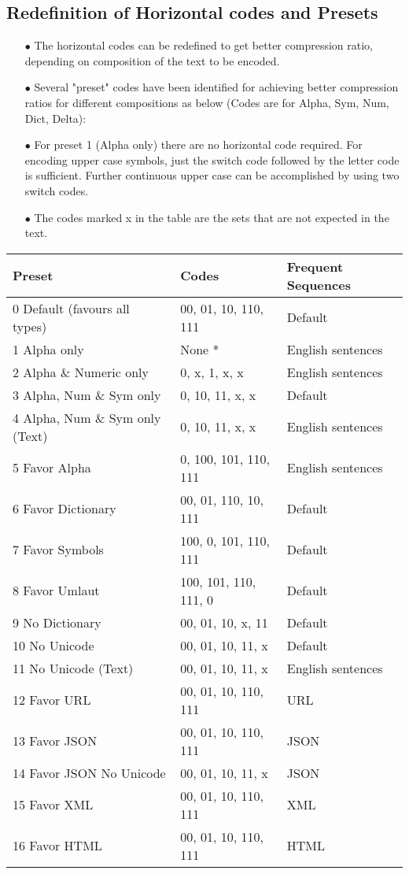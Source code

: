\documentclass[]{article}
\begin{document}
\subsection{Redefinition of Horizontal codes and Presets}
\begin{itemize}
	\item[$\bullet$] The horizontal codes can be redefined to get better compression ratio, depending on composition of the text to be encoded.
	\item[$\bullet$] Several "preset" codes have been identified for achieving better compression ratios for different compositions as below (Codes are for Alpha, Sym, Num, Dict, Delta):
	\item[$\bullet$] For preset 1 (Alpha only) there are no horizontal code required.  For encoding upper case symbols, just the switch code followed by the letter code is sufficient.  Further continuous upper case can be accomplished by using two switch codes.
	\item[$\bullet$] The codes marked x in the table are the sets that are not expected in the text.
\end{itemize}
\begin{tabular}{ | l | l | l |} \hline
	﻿\textbf{Preset} & ﻿\textbf{Codes} & \textbf{Frequent Sequences} \\ \hline
	0 Default (favours all types) & 00, 01, 10, 110, 111 & Default \\ \hline
	1 Alpha only & None * & English sentences \\ \hline
	2 Alpha \& Numeric only & 0, x, 1, x, x & English sentences \\ \hline
	3 Alpha, Num \& Sym only & 0, 10, 11, x, x & Default \\ \hline
	4 Alpha, Num \& Sym only (Text) & 0, 10, 11, x, x & English sentences \\ \hline
	5 Favor Alpha & 0, 100, 101, 110, 111 & English sentences \\ \hline
	6 Favor Dictionary & 00, 01, 110, 10, 111 & Default \\ \hline
	7 Favor Symbols & 100, 0, 101, 110, 111 & Default \\ \hline
	8 Favor Umlaut & 100, 101, 110, 111, 0 & Default \\ \hline
	9 No Dictionary & 00, 01, 10, x, 11 & Default \\ \hline
	10 No Unicode & 00, 01, 10, 11, x & Default \\ \hline
	11 No Unicode (Text) & 00, 01, 10, 11, x & English sentences \\ \hline
	12 Favor URL & 00, 01, 10, 110, 111 & URL \\ \hline
	13 Favor JSON & 00, 01, 10, 110, 111 & JSON \\ \hline
	14 Favor JSON No Unicode & 00, 01, 10, 11, x & JSON \\ \hline
	15 Favor XML & 00, 01, 10, 110, 111 & XML \\ \hline
	16 Favor HTML & 00, 01, 10, 110, 111 & HTML \\ \hline
\end{tabular}
\end{document}
